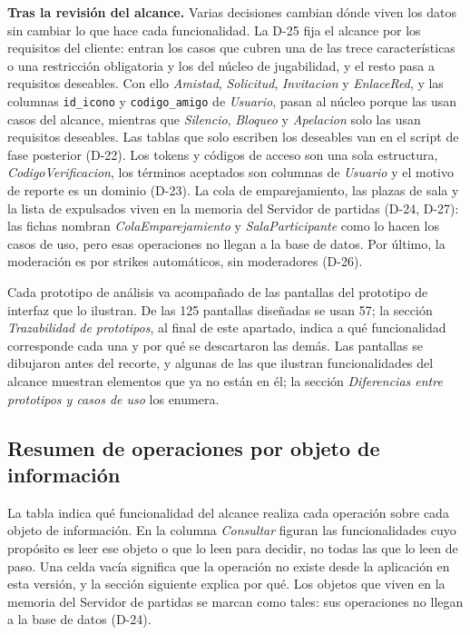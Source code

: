 \textbf{Tras la revisión del alcance.} Varias decisiones cambian dónde viven los datos sin cambiar lo que hace cada funcionalidad. La \mbox{D-25} fija el alcance por los requisitos del cliente: entran los casos que cubren una de las trece características o una restricción obligatoria y los del núcleo de jugabilidad, y el resto pasa a requisitos deseables. Con ello \textit{Amistad}, \textit{Solicitud}, \textit{Invitacion} y \textit{EnlaceRed}, y las columnas \texttt{id\_\allowbreak{}icono} y \texttt{codigo\_\allowbreak{}amigo} de \textit{Usuario}, pasan al núcleo porque las usan casos del alcance, mientras que \textit{Silencio}, \textit{Bloqueo} y \textit{Apelacion} solo las usan requisitos deseables. Las tablas que solo escriben los deseables van en el script de fase posterior (\mbox{D-22}). Los tokens y códigos de acceso son una sola estructura, \textit{CodigoVerificacion}, los términos aceptados son columnas de \textit{Usuario} y el motivo de reporte es un dominio (\mbox{D-23}). La cola de emparejamiento, las plazas de sala y la lista de expulsados viven en la memoria del Servidor de partidas (\mbox{D-24}, \mbox{D-27}): las fichas nombran \textit{ColaEmparejamiento} y \textit{SalaParticipante} como lo hacen los casos de uso, pero esas operaciones no llegan a la base de datos. Por último, la moderación es por strikes automáticos, sin moderadores (\mbox{D-26}).

Cada prototipo de análisis va acompañado de las pantallas del prototipo de interfaz que lo ilustran. De las 125 pantallas diseñadas se usan 57; la sección \textit{Trazabilidad de prototipos}, al final de este apartado, indica a qué funcionalidad corresponde cada una y por qué se descartaron las demás. Las pantallas se dibujaron antes del recorte, y algunas de las que ilustran funcionalidades del alcance muestran elementos que ya no están en él; la sección \textit{Diferencias entre prototipos y casos de uso} los enumera.

\subsection*{Resumen de operaciones por objeto de información}

La tabla indica qué funcionalidad del alcance realiza cada operación sobre cada objeto de información. En la columna \textit{Consultar} figuran las funcionalidades cuyo propósito es leer ese objeto o que lo leen para decidir, no todas las que lo leen de paso. Una celda vacía significa que la operación no existe desde la aplicación en esta versión, y la sección siguiente explica por qué. Los objetos que viven en la memoria del Servidor de partidas se marcan como tales: sus operaciones no llegan a la base de datos (\mbox{D-24}).

